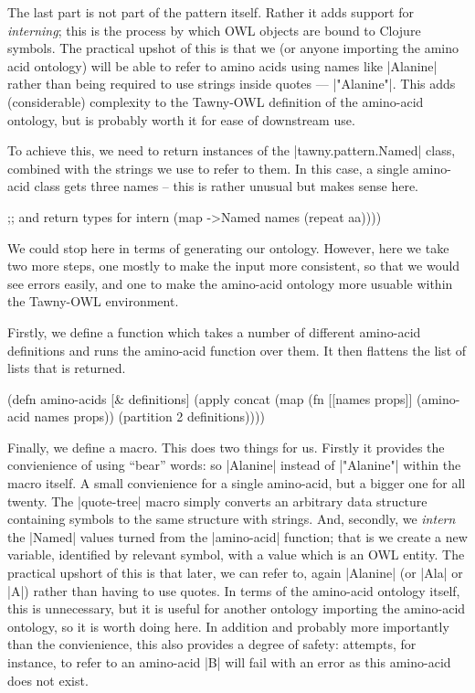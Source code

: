 The last part is not part of the pattern itself. Rather it adds support for
\emph{interning}; this is the process by which OWL objects are bound to
Clojure symbols. The practical upshot of this is that we (or anyone importing
the amino acid ontology) will be able to refer to amino acids using names like
|Alanine| rather than being required to use strings inside quotes ---
|"Alanine"|. This adds (considerable) complexity to the Tawny-OWL definition
of the amino-acid ontology, but is probably worth it for ease of downstream
use.

To achieve this, we need to return instances of the |tawny.pattern.Named|
class, combined with the strings we use to refer to them. In this case, a
single amino-acid class gets three names -- this is rather unusual but makes
sense here.

\begin{tawny}
    ;; and return types for intern
    (map ->Named
         names
         (repeat aa))))
\end{tawny}

We could stop here in terms of generating our ontology. However, here we take
two more steps, one mostly to make the input more consistent, so that we would
see errors easily, and one to make the amino-acid ontology more usuable within
the Tawny-OWL environment.

Firstly, we define a function which takes a number of different amino-acid
definitions and runs the amino-acid function over them. It then flattens the
list of lists that is returned.

\begin{tawny}
(defn amino-acids
  [& definitions]
  (apply
   concat
   (map
    (fn [[names props]] (amino-acid names props))
    (partition 2 definitions))))
\end{tawny}

Finally, we define a macro. This does two things for us. Firstly it provides
the convienience of using ``bear'' words: so |Alanine| instead of |"Alanine"|
within the macro itself. A small convienience for a single amino-acid, but a
bigger one for all twenty. The |quote-tree| macro simply converts an arbitrary
data structure containing symbols to the same structure with strings. And,
secondly, we \emph{intern} the |Named| values turned from the |amino-acid|
function; that is we create a new variable, identified by relevant symbol,
with a value which is an OWL entity. The practical upshort of this is that
later, we can refer to, again |Alanine| (or |Ala| or |A|) rather than having
to use quotes. In terms of the amino-acid ontology itself, this is
unnecessary, but it is useful for another ontology importing the amino-acid
ontology, so it is worth doing here. In addition and probably more importantly
than the convienience, this also provides a degree of safety: attempts, for
instance, to refer to an amino-acid |B| will fail with an error as this
amino-acid does not exist.

